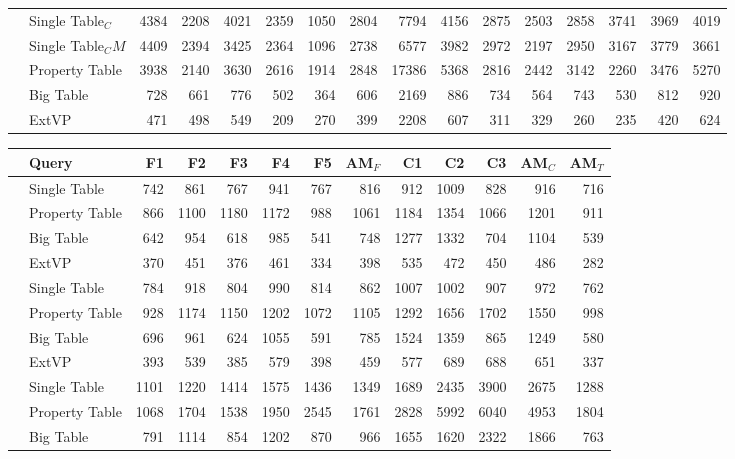 \documentclass[
  a4paper,
  12pt,
  oneside,
  parskip=half,
  headsepline,
]{scrartcl}
\begin{document}
\begin{table*}[htb]
\begin{tabular*}{\textwidth}{ ll @{\extracolsep{\fill}} rrrrrrrrrrrrrr }
		& Single Table$_C$ & 4384 & 2208 & 4021 & 2359 & 1050 & 2804 & 7794 & 4156 & 2875 & 2503 & 2858 & 3741 & 3969 & 4019 \\
		& Single Table$_CM$ & 4409 & 2394 & 3425 & 2364 & 1096 & 2738 & 6577 & 3982 & 2972 & 2197 & 2950 & 3167 & 3779 & 3661 \\
		& Property Table & 3938 & 2140 & 3630 & 2616 & 1914 & 2848 & 17386 & 5368 & 2816 & 2442 & 3142 & 2260 & 3476 & 5270 \\
		& Big Table & 728 & 661 & 776 & 502 & 364 & 606 & 2169 & 886 & 734 & 564 & 743 & 530 & 812 & 920 \\
		& ExtVP & 471 & 498 & 549 & 209 & 270 & 399 & 2208 & 607 & 311 & 329 & 260 & 235 & 420 & 624
  	\end{tabular*}

  	\begin{tabular*}{\textwidth}{ ll @{\extracolsep{\fill}} rrrrrrrrrrr }
		\midrule
		& Query & F1 & F2 & F3 & F4 & F5 & AM$_F$ & C1 & C2 & C3 & AM$_C$ & AM$_T$ \\
		\midrule
		\multirow{4}{*}{\rotatebox{90}{SF10}}
		& Single Table & 742 & 861 & 767 & 941 & 767 & 816 & 912 & 1009 & 828 & 916 & 716 \\
		& Property Table & 866 & 1100 & 1180 & 1172 & 988 & 1061 & 1184 & 1354 & 1066 & 1201 & 911 \\
		& Big Table & 642 & 954 & 618 & 985 & 541 & 748 & 1277 & 1332 & 704 & 1104 & 539 \\
		& ExtVP & 370 & 451 & 376 & 461 & 334 & 398 & 535 & 472 & 450 & 486 & 282 \\
		\midrule
		\multirow{4}{*}{\rotatebox{90}{SF100}}
		& Single Table & 784 & 918 & 804 & 990 & 814 & 862 & 1007 & 1002 & 907 & 972 & 762 \\
		& Property Table & 928 & 1174 & 1150 & 1202 & 1072 & 1105 & 1292 & 1656 & 1702 & 1550 & 998 \\
		& Big Table & 696 & 961 & 624 & 1055 & 591 & 785 & 1524 & 1359 & 865 & 1249 & 580 \\
		& ExtVP & 393 & 539 & 385 & 579 & 398 & 459 & 577 & 689 & 688 & 651 & 337 \\
		\midrule
		\multirow{4}{*}{\rotatebox{90}{SF1000}}
		& Single Table & 1101 & 1220 & 1414 & 1575 & 1436 & 1349 & 1689 & 2435 & 3900 & 2675 & 1288 \\
		& Property Table & 1068 & 1704 & 1538 & 1950 & 2545 & 1761 & 2828 & 5992 & 6040 & 4953 & 1804 \\
		& Big Table & 791 & 1114 & 854 & 1202 & 870 & 966 & 1655 & 1620 & 2322 & 1866 & 763 \\

\end{tabular*}
\end{table*}
\end{document}
